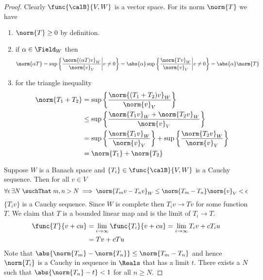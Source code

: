 \begin{proof}
    Clearly \(\func{\calB}{V,W}\) is a vector space. For its norm \(\norm{T}\) we have
    \begin{enumerate}
        \item \(\norm{T} \geq 0\) by definition.
        \item if \(\alpha \in \Field_W\) then
              \begin{equation*}
                  \norm{\alpha T} = \sup \left\{ \dfrac{\norm{(\alpha T)v}_W}{\norm{v}_V} \middle| v \neq 0 \right\} = \abs{\alpha} \sup \left\{ \dfrac{\norm{Tv}_W}{\norm{v}_V} \middle| v \neq 0 \right\} = \abs{\alpha} \norm{T}
              \end{equation*}
        \item for the triangle inequality
              \begin{align*}
                  \norm{T_1 + T_2} & = \sup \left\{ \dfrac{\norm{(T_1 + T_2)v}_W}{\norm{v}_V} \right\}                                                     \\
                                   & \leq \sup \left\{ \dfrac{\norm{T_1v}_W + \norm{T_2v}_W}{\norm{v}_V} \right\}                                          \\
                                   & = \sup \left\{ \dfrac{\norm{T_1v}_W}{\norm{v}_V} \right\} + \sup \left\{ \dfrac{\norm{ T_2 v}_W}{\norm{v}_V} \right\} \\
                                   & = \norm{T_1} + \norm{T_2}
              \end{align*}
    \end{enumerate}
    Suppose \(W\) is a Banach space and \(\{T_i\} \in \func{\calB}{V,W}\) is a Cauchy sequence. Then for all \(v \in V\)
    \begin{equation*}
        \forall \epsilon \, \exists N \; \suchThat \; m,n > N \implies \norm{T_m v - T_n v}_W \leq \norm{T_m - T_n}\norm{v}_V < \epsilon
    \end{equation*}
    \(\{T_i v\}\) is a Cauchy sequence. Since \(W\) is complete then \(T_i v \to Tv\) for some function \(T\). We claim that \(T\) is a bounded linear map and is the limit of \(T_i \to T\).
    \begin{align*}
        \func{T}{v + cu} & = \lim_{i \to \infty} \func{T_i}{v + cu} = \lim_{i \to \infty} T_i v + c T_i u \\
                         & = Tv + c Tu
    \end{align*}
    Note that  \( \abs{{\norm{T_m} - \norm{T_n}}} \leq \norm{T_m - T_n}\) and hence \(\norm{T_i}\) is a Cauchy in sequence in \(\Reals\) that has a limit \(t\). There exists a \(N\) such that \(\abs{{\norm{T_n} - t}} < 1\) for all \(n \geq N\).

\end{proof}
